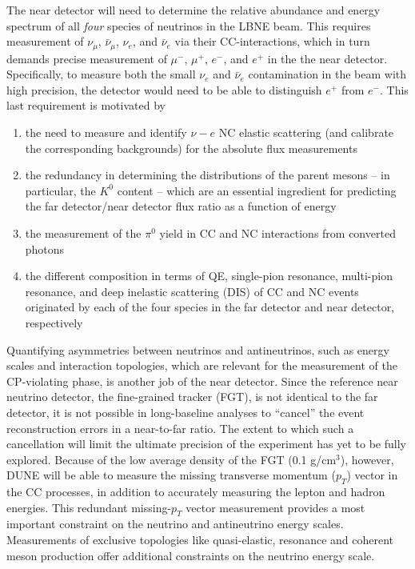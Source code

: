 The near detector will need to determine the relative abundance and 
energy spectrum of all \textit{four} species of neutrinos in the LBNE beam.
%
This requires measurement of 
$\nu_\mu$, $\bar \nu_\mu$, $\nu_e$, and $\bar \nu_e$ via their  CC-interactions,  
which in turn demands precise measurement of $\mu^-$, $\mu^+$, $e^-$, and $e^+$ in the 
the near detector. Specifically, to measure both the small $\nu_e$ and $\bar \nu_e$ contamination in the beam with high precision, 
the detector would need to be able to distinguish $e^+$  from $e^-$. 
This last requirement is motivated by 
\begin{enumerate}
\item the need to measure and identify $\nu - e$ NC elastic scattering (and calibrate 
the corresponding backgrounds) for the absolute flux measurements
\item  the redundancy in determining the distributions 
of the parent mesons -- %
in particular, the $K^0$ content -- 
which are an essential ingredient for predicting 
the far detector/near detector flux ratio as a function of energy
\item the measurement of the $\pi^0$ yield in CC and NC interactions 
from converted photons
\item the different composition in terms of QE, single-pion resonance, multi-pion resonance, and deep inelastic scattering (DIS) of CC and NC events originated by each of the four species in the far detector and near detector, respectively 
\end{enumerate}


Quantifying asymmetries between neutrinos and antineutrinos, such as 
energy scales and interaction topologies, which are relevant for the measurement of the CP-violating phase, is
another job of the near detector.
%
Since the reference near neutrino detector, the fine-grained tracker (FGT),  
is not identical to the far
 detector, it is not possible in long-baseline analyses to ``cancel'' the event reconstruction
 errors in a near-to-far ratio.  
The extent to which such a cancellation will limit the ultimate precision of the experiment has yet to
 be fully explored. 
Because of the low average density of the FGT (0.1 g/cm$^3$), however, DUNE will be able to 
measure the missing transverse momentum ($p_{T}$)  vector in the CC processes, in addition to accurately 
measuring the lepton and hadron energies.
This redundant missing-$p_{T}$ vector measurement provides a most important
constraint on the neutrino and antineutrino energy scales. Measurements of
exclusive topologies like quasi-elastic, resonance and
coherent meson production offer additional constraints on the neutrino energy scale. 


